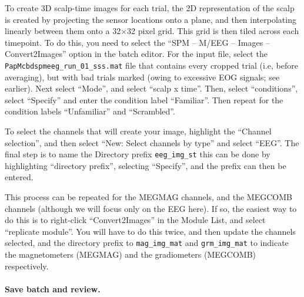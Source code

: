 To create 3D scalp-time images for each trial, the 2D representation of the scalp is created by projecting the sensor locations onto a plane, and then interpolating linearly between them onto a 32\(\times\)32 pixel grid. This grid is then tiled across each timepoint. To do this, you need to select the ``SPM -- M/EEG -- Images -- Convert2Images'' option in the batch editor. For the input file, select the \texttt{PapMcbdspmeeg\_run\_01\_sss.mat} file that contains every cropped trial (i.e, before averaging), but with bad trials marked (owing to excessive EOG signals; see earlier). Next select ``Mode'', and select ``scalp x time''. Then, select ``conditions'', select ``Specify'' and enter the condition label ``Familiar''. Then repeat for the condition labels ``Unfamiliar'' and ``Scrambled''. 

To select the channels that will create your image, highlight the ``Channel selection'', and then select ``New: Select channels by type'' and select ``EEG''. The final step is to name the Directory prefix \texttt{eeg\_img\_st} this can be done by highlighting ``directory prefix'', selecting ``Specify'', and the prefix can then be entered.

This process can be repeated for the MEGMAG channels, and the MEGCOMB channels (although we will focus only on the EEG here). If so, the easiest way to do this is to right-click ``Convert2Images'' in the Module List, and select ``replicate module''. You will have to do this twice, and then update the channels selected, and the directory prefix to \texttt{mag\_img\_mat} and \texttt{grm\_img\_mat} to indicate the magnetometers (MEGMAG) and the gradiometers (MEGCOMB) respectively. 

\paragraph{Save batch and review.}


